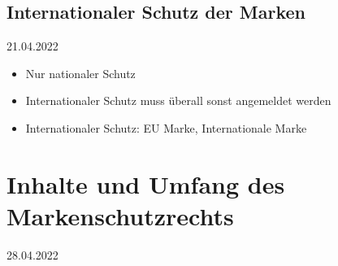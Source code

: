 \documentclass{report}
\begin{document}
\subsection{Internationaler Schutz der Marken}
21.04.2022
\begin{itemize}
	\item Nur nationaler Schutz
	\item Internationaler Schutz muss überall sonst angemeldet werden
	\item Internationaler Schutz: EU Marke, Internationale Marke
\end{itemize}

\section{Inhalte und Umfang des Markenschutzrechts}
28.04.2022
\end{document}
